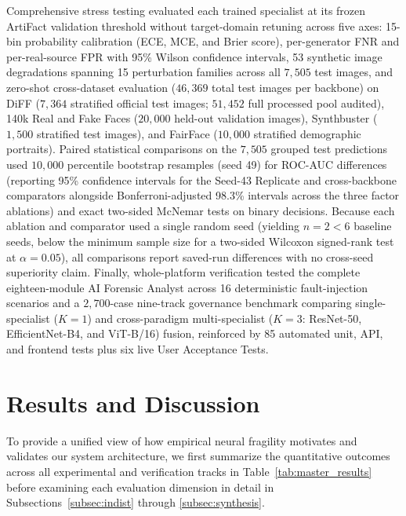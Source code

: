\documentclass[final,5p,times,twocolumn,numafflabel]{elsarticle}
\begin{document}
Comprehensive stress testing evaluated each trained specialist at its frozen ArtiFact validation threshold without target-domain retuning across five axes: 15-bin probability calibration (ECE, MCE, and Brier score), per-generator FNR and per-real-source FPR with 95\% Wilson confidence intervals, 53 synthetic image degradations spanning 15 perturbation families across all $7{,}505$ test images, and zero-shot cross-dataset evaluation ($46{,}369$ total test images per backbone) on DiFF ($7{,}364$ stratified official test images; $51{,}452$ full processed pool audited), 140k Real and Fake Faces ($20{,}000$ held-out validation images), Synthbuster ($1{,}500$ stratified test images), and FairFace ($10{,}000$ stratified demographic portraits). Paired statistical comparisons on the $7{,}505$ grouped test predictions used $10{,}000$ percentile bootstrap resamples (seed 49) for ROC-AUC differences (reporting 95\% confidence intervals for the Seed-43 Replicate and cross-backbone comparators alongside Bonferroni-adjusted 98.3\% intervals across the three factor ablations) and exact two-sided McNemar tests on binary decisions. Because each ablation and comparator used a single random seed (yielding $n = 2 < 6$ baseline seeds, below the minimum sample size for a two-sided Wilcoxon signed-rank test at $\alpha = 0.05$), all comparisons report saved-run differences with no cross-seed superiority claim. Finally, whole-platform verification tested the complete eighteen-module AI Forensic Analyst across 16 deterministic fault-injection scenarios and a $2{,}700$-case nine-track governance benchmark comparing single-specialist ($K = 1$) and cross-paradigm multi-specialist ($K = 3$: ResNet-50, EfficientNet-B4, and ViT-B/16) fusion, reinforced by 85 automated unit, API, and frontend tests plus six live User Acceptance Tests.

\section{Results and Discussion}
\label{sec:results}

To provide a unified view of how empirical neural fragility motivates and validates our system architecture, we first summarize the quantitative outcomes across all experimental and verification tracks in Table~\ref{tab:master_results} before examining each evaluation dimension in detail in Subsections~\ref{subsec:indist} through \ref{subsec:synthesis}.
\end{document}
